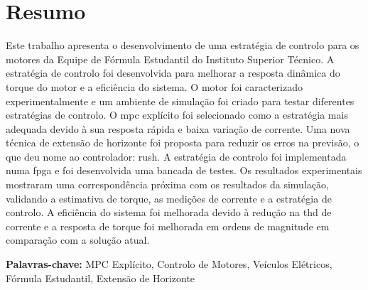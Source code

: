 
\section*{Resumo}


Este trabalho apresenta o desenvolvimento de uma estratégia de controlo para os motores da Equipe de Fórmula Estudantil do Instituto Superior Técnico. A estratégia de controlo foi desenvolvida para melhorar a resposta dinâmica do torque do motor e a eficiência do sistema. O motor foi caracterizado experimentalmente e um ambiente de simulação foi criado para testar diferentes estratégias de controlo. O \gls{mpc} explícito foi selecionado como a estratégia mais adequada devido à sua resposta rápida e baixa variação de corrente. Uma nova técnica de extensão de horizonte foi proposta para reduzir os erros na previsão, o que deu nome ao controlador: \acrfull{rush}. A estratégia de controlo foi implementada numa \gls{fpga} e foi desenvolvida uma bancada de testes. Os resultados experimentais mostraram uma correspondência próxima com os resultados da simulação, validando a estimativa de torque, as medições de corrente e a estratégia de controlo. A eficiência do sistema foi melhorada devido à redução na \gls{thd} de corrente e a resposta de torque foi melhorada em ordens de magnitude em comparação com a solução atual.

\vfill

\textbf{\Large Palavras-chave:} MPC Explícito, Controlo de Motores, Veículos Elétricos, Fórmula Estudantil, Extensão de Horizonte

